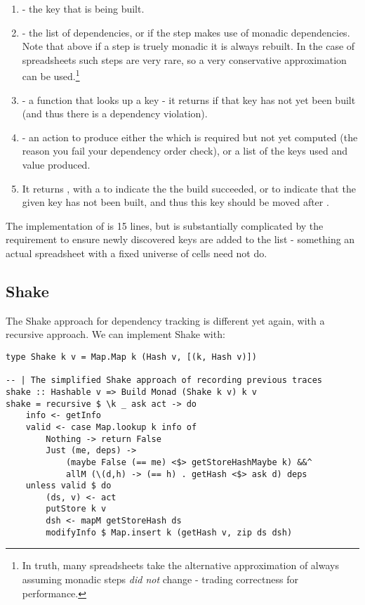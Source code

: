 \begin{enumerate}
\item {} - the key that is being built.
\item {} - the list of dependencies, or  if the step makes use of monadic dependencies. Note that above if a step is truely monadic it is always rebuilt. In the case of spreadsheets such steps are very rare, so a very conservative approximation can be used.\footnote{In truth, many spreadsheets take the alternative approximation of always assuming monadic steps \textit{did not} change - trading correctness for performance.}
\item {} - a function that looks up a key - it returns  if that key has not yet been built (and thus there is a dependency violation).
\item {} - an action to produce either the  which is required but not yet computed (the reason you fail your dependency order check), or a list of the keys used and value produced.
\item It returns , with a  to indicate the the build succeeded, or  to indicate that the given key  has not been built, and thus this key should be moved after .
\end{enumerate}

The implementation of  is 15 lines, but is substantially complicated by the requirement to ensure newly discovered keys are added to the list - something an actual spreadsheet with a fixed universe of cells need not do.

\subsection{Shake}

The Shake approach for dependency tracking is different yet again, with a recursive approach. We can implement Shake with:

\begin{verbatim}
type Shake k v = Map.Map k (Hash v, [(k, Hash v)])

-- | The simplified Shake approach of recording previous traces
shake :: Hashable v => Build Monad (Shake k v) k v
shake = recursive $ \k _ ask act -> do
    info <- getInfo
    valid <- case Map.lookup k info of
        Nothing -> return False
        Just (me, deps) ->
            (maybe False (== me) <$> getStoreHashMaybe k) &&^
            allM (\(d,h) -> (== h) . getHash <$> ask d) deps
    unless valid $ do
        (ds, v) <- act
        putStore k v
        dsh <- mapM getStoreHash ds
        modifyInfo $ Map.insert k (getHash v, zip ds dsh)
\end{verbatim}

